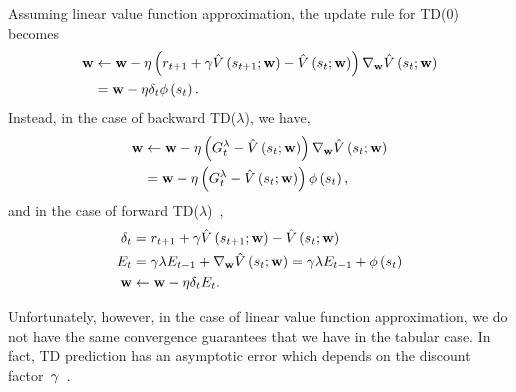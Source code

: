 Assuming linear value function approximation, the update rule for TD(0) becomes
\begin{align}
	\mathbf{w}
		&\gets\mathbf{w}-\eta\left(r_{t+1}+\gamma\hat{V}\left(s_{t+1};\mathbf{w}\right)-\hat{V}\left(s_{t};\mathbf{w}\right)\right)\nabla_{\mathbf{w}}\hat{V}\left(s_{t};\mathbf{w}\right) \notag \\
		&=\mathbf{w}-\eta\delta_{t}\phi\left(s_{t}\right).
\end{align}
Instead, in the case of backward TD(${\lambda}$), we have,
\begin{align}
	\mathbf{w}
		&\gets\mathbf{w}-\eta\left(G_{t}^{\lambda}-\hat{V}\left(s_{t};\mathbf{w}\right)\right)\nabla_{\mathbf{w}}\hat{V}\left(s_{t};\mathbf{w}\right) \notag \\
		&=\mathbf{w}-\eta\left(G_{t}^{\lambda}-\hat{V}\left(s_{t};\mathbf{w}\right)\right)\phi\left(s_{t}\right),
\end{align}
and in the case of forward TD(${\lambda}$)~\cite{sutton1988td},
\begin{equation}
\begin{split}
	\delta_{t}&=r_{t+1}+\gamma\hat{V}\left(s_{t+1};\mathbf{w}\right)-\hat{V}\left(s_{t};\mathbf{w}\right) \\
	E_{t}&=\gamma\lambda E_{t-1}+\nabla_{\mathbf{w}}\hat{V}\left(s_{t};\mathbf{w}\right)=\gamma\lambda E_{t-1}+\phi\left(s_{t}\right) \\
	\mathbf{w}&\gets\mathbf{w}-\eta\delta_{t}E_{t}.
\end{split}
\end{equation}

Unfortunately, however, in the case of linear value function approximation, we do not have the same convergence guarantees that we have in the tabular case. In fact, TD prediction has an asymptotic error which depends on the discount factor~${\gamma}$~\cite{tsitsiklis1996}.

